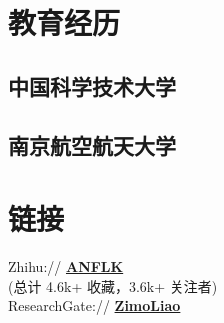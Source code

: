 \documentclass[]{deedy-resume-openfont}
\begin{document}
%
%
\lastupdated

%
%

%
%

\begin{minipage}[t]{0.25\textwidth} 


\section{教育经历} 
\sectionsep

\subsection{中国科学技术大学}
\sectionsep

\subsection{南京航空航天大学}
\sectionsep


\section{链接}
\sectionsep
Zhihu://  \href{https://www.zhihu.com/people/lzmo}{\bf ANFLK} \\
(总计 4.6k+ 收藏，3.6k+ 关注者) \\    
ResearchGate:// \href{https://www.researchgate.net/profile/Zimo_Liao}{\bf ZimoLiao} \\
\sectionsep



\end{minipage}
\end{document}
